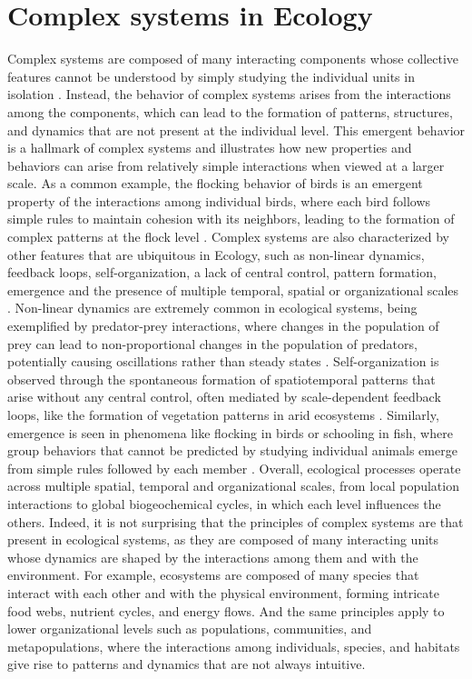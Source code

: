 \section{\label{sec:Complex systems in Ecology} Complex systems in Ecology}

Complex systems are composed of many interacting components
whose collective features cannot be understood by simply studying the
individual units in isolation \cite{Bianconi_2023}. Instead, the behavior of
complex systems arises from the interactions among the components, which can
lead to the formation of patterns, structures, and dynamics that are not
present at the individual level. This emergent behavior is a hallmark of
complex systems and illustrates how new properties and behaviors can arise from
relatively simple interactions when viewed at a larger scale. As a common
example, the flocking behavior of birds is an emergent property of the
interactions among individual birds, where each bird follows simple rules to
maintain cohesion with its neighbors, leading to the formation of complex
patterns at the flock level \cite{Vicsek1995}. Complex systems are also
characterized by other features that are ubiquitous in Ecology, such as
non-linear dynamics, feedback loops, self-organization, a lack of central
control, pattern formation, emergence and the presence of multiple temporal,
spatial or organizational scales \cite{Bianconi_2023}. Non-linear dynamics are
extremely common in ecological systems, being exemplified by predator-prey
interactions, where changes in the population of prey can lead to
non-proportional changes in the population of predators, potentially causing
oscillations rather than steady states \cite{Lotka1925}. Self-organization is
observed through the spontaneous formation of spatiotemporal patterns that
arise without any central control, often mediated by scale-dependent feedback
loops, like the formation of vegetation patterns in arid ecosystems
\cite{Rietkerk2008}. Similarly, emergence is seen in phenomena like flocking in
birds or schooling in fish, where group behaviors that cannot be predicted by
studying individual animals emerge from simple rules followed by each member
\cite{Vicsek1995}. Overall, ecological processes operate across multiple
spatial, temporal and organizational scales, from local population interactions
to global biogeochemical cycles, in which each level influences the others.
Indeed, it is not surprising that the principles of complex systems are that
present in ecological systems, as they are composed of many interacting units
whose dynamics are shaped by the interactions among them and with the
environment. For example, ecosystems are composed of many species that
interact with each other and with the physical environment, forming intricate
food webs, nutrient cycles, and energy flows. And the same principles apply to
lower organizational levels such as populations, communities, and
metapopulations, where the interactions among individuals, species, and
habitats give rise to patterns and dynamics that are not always intuitive.

